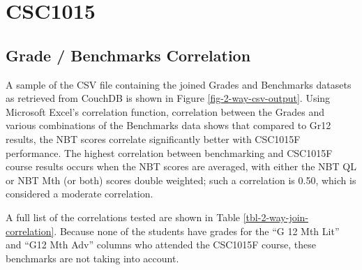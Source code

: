 \section{CSC1015}
\subsection{Grade / Benchmarks Correlation}
A sample of the CSV file containing the joined Grades and Benchmarks datasets as retrieved from CouchDB is shown in Figure \ref{fig-2-way-csv-output}. Using Microsoft Excel's correlation function, correlation between the Grades and various combinations of the Benchmarks data shows that compared to Gr12 results, the NBT scores correlate significantly better with CSC1015F performance. The highest correlation between benchmarking and CSC1015F course results occurs when the NBT scores are averaged, with either the NBT QL or NBT Mth (or both) scores double weighted; such a correlation is 0.50, which is considered a moderate correlation.

A full list of the correlations tested are shown in Table \ref{tbl-2-way-join-correlation}. Because none of the students have grades for the ``G 12 Mth Lit'' and ``G12 Mth Adv'' columns who attended the CSC1015F course, these benchmarks are not taking into account.


